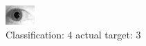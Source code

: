 \begin{figure}[h!]
\begin{center}
\includegraphics[width=0.60\columnwidth]{figures/ID1901_class_4_target_3.png}
\end{center}
\caption{ Classification: 4 actual target: 3}
\label{fig:ID1901_class_4_target_3}
\end{figure}
